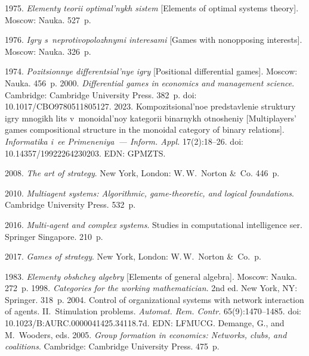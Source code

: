   \begin{multicols}{2}

\renewcommand{\bibname}{\protect\rmfamily References}

{\small\frenchspacing
 {%
 \begin{thebibliography}{99} 

 1975. \textit{Elementy teorii optimal'nykh sistem} [Elements of optimal systems 
theory]. Moscow: Nauka. 527~p.

 1976. \textit{Igry s~neprotivopolozhnymi interesami} [Games with  
nonopposing interests]. Moscow: Nauka. 326~p.

 1974. \textit{Pozitsionnye differentsial'nye igry} 
[Positional differential games]. Moscow: Nauka. 456~p.
 2000. \textit{Differential games in 
economics and management science}. Cambridge: Cambridge University Press. 382~p. doi: 
10.1017/CBO9780511805127.
 2023. Kompozitsional'noe predstavlenie struktury igry mnogikh lits 
v~monoidal'noy kategorii binarnykh otnosheniy [Multiplayers' games compositional structure in the 
monoidal category of binary relations]. \textit{Informatika i~ee Primeneniya~--- Inform. Appl.} 
 17(2):18--26. doi: 10.14357/19922264230203. EDN: GPMZTS.
 
 2008. \textit{The art of strategy}. New York, London: 
W.\,W.~Norton \&~Co. 446~p.


 2010. \textit{Multiagent systems: Algorithmic,  
game-theoretic, and logical foundations}. Cambridge University Press. 532~p.

 2016. \textit{Multi-agent and complex systems}. Studies 
in computational intelligence ser.  Springer Singapore. 210~p.

 2017. \textit{Games of strategy}. New York, 
London: W.\,W.~Norton \&~Co.~p.

 1983. \textit{Elementy obshchey algebry} [Elements of general algebra]. 
Moscow: Nauka. 272~p.
 1998. \textit{Categories for the working mathematician}. 2nd ed. New York, NY: 
Springer. 318~p. 
 2004. Control of organizational systems with network interaction of agents. 
II.~Stimulation problems. \textit{Automat. Rem. Contr.} 65(9):1470--1485. doi: 
10.1023/B:AURC.0000041425.34118.7d. EDN: \mbox{LFMUCG}.
Demange, G., and M.~Wooders, eds. 2005. \textit{Group formation in economics: Networks, clubs, and 
coalitions}. Cambridge: Cambridge University Press. 475~p. 


\end{thebibliography}}}
\end{multicols}

